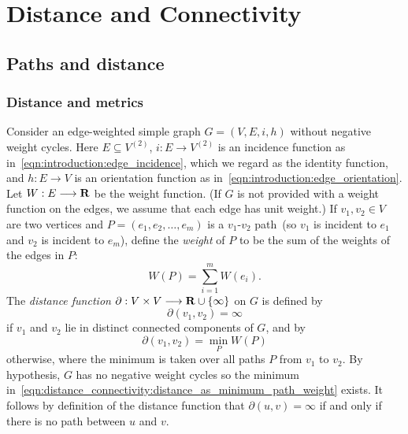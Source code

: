 
\chapter{Distance and Connectivity}
\label{chap:distance_connectivity}



\section{Paths and distance}



\subsection{Distance and metrics}

Consider an edge-weighted simple graph $G = (V,E,i,h)$ without
negative weight cycles. Here $E \subseteq V^{(2)}$, $i: E \to V^{(2)}$
is an incidence function as in~\eqref{eqn:introduction:edge_incidence},
which we regard as the identity function, and $h: E \to V$ is an
orientation function as in~\eqref{eqn:introduction:edge_orientation}.
Let $W: E \longrightarrow \mathbf{R}$ be the weight function. (If $G$ is not provided with
a weight function on the edges, we assume that each edge has unit
weight.) If $v_1, v_2 \in V$ are two vertices and
$P = (e_1, e_2, \dots, e_m)$ is a $v_1$-$v_2$ path~(so $v_1$ is
incident to $e_1$ and $v_2$ is incident to $e_m$), define the
\emph{weight} of $P$ to be the sum of the weights
of the edges in $P$:
\[
W(P)
=
\sum_{i=1}^m W(e_i).
\]
The \emph{distance function}
$\partial: V \times V \longrightarrow \mathbf{R} \cup \{\infty\}$ on $G$ is defined by
\[
\partial(v_1, v_2)
=
\infty
\]
if $v_1$ and $v_2$ lie in distinct connected components of $G$, and by
\begin{equation}
\label{eqn:distance_connectivity:distance_as_minimum_path_weight}
\partial(v_1, v_2)
=
\min_P W(P)
\end{equation}
otherwise, where the minimum is taken over all paths $P$ from $v_1$ to
$v_2$. By hypothesis, $G$ has no negative weight cycles so the minimum
in~\eqref{eqn:distance_connectivity:distance_as_minimum_path_weight}
exists. It follows by definition of the distance function that
$\partial(u,v) = \infty$ if and only if there is no path between $u$
and $v$.

